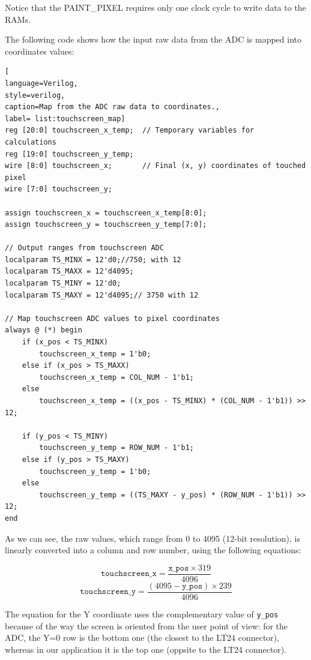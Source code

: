 \documentclass[11pt]{report}
\begin{document}
Notice that the PAINT\_PIXEL requires only one clock cycle to write data to the RAMs.

The following code shows how the input raw data from the ADC is mapped into coordinates values:

\begin{lstlisting}[
language=Verilog,
style=verilog,
caption=Map from the ADC raw data to coordinates.,
label= list:touchscreen_map]
reg [20:0] touchscreen_x_temp;	// Temporary variables for calculations
reg [19:0] touchscreen_y_temp;
wire [8:0] touchscreen_x;	    // Final (x, y) coordinates of touched pixel
wire [7:0] touchscreen_y;
	 
assign touchscreen_x = touchscreen_x_temp[8:0];
assign touchscreen_y = touchscreen_y_temp[7:0]; 
 
// Output ranges from touchscreen ADC
localparam TS_MINX = 12'd0;//750; with 12
localparam TS_MAXX = 12'd4095;
localparam TS_MINY = 12'd0;
localparam TS_MAXY = 12'd4095;// 3750 with 12
 
// Map touchscreen ADC values to pixel coordinates
always @ (*) begin
    if (x_pos < TS_MINX)
        touchscreen_x_temp = 1'b0;
    else if (x_pos > TS_MAXX)
        touchscreen_x_temp = COL_NUM - 1'b1;
    else
        touchscreen_x_temp = ((x_pos - TS_MINX) * (COL_NUM - 1'b1)) >> 12;
           
    if (y_pos < TS_MINY)
        touchscreen_y_temp = ROW_NUM - 1'b1;
    else if (y_pos > TS_MAXY)
        touchscreen_y_temp = 1'b0;
    else
        touchscreen_y_temp = ((TS_MAXY - y_pos) * (ROW_NUM - 1'b1)) >> 12;
end
\end{lstlisting}

As we can see, the raw values, which range from 0 to 4095 (12-bit resolution), is linearly converted into a column and row number, using the following equations:

\begin{equation}
    \texttt{touchscreen\_x}=\frac{\texttt{x\_pos}\times319}{4096}
\end{equation}
\begin{equation}
    \texttt{touchscreen\_y}=\frac{(4095-\texttt{y\_pos})\times239}{4096}
\end{equation}

The equation for the Y coordinate uses the complementary value of \texttt{y\_pos} because of the way the screen is oriented from the user point of view: for the ADC, the Y=0 row is the bottom one (the closest to the LT24 connector), whereas in our application it is the top one (oppsite to the LT24 connector).
\end{document}
